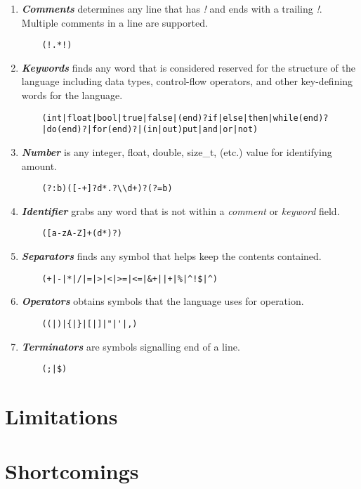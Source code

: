 \documentclass{article}
\begin{document}
    \begin{enumerate}

        \item \emph{\textbf{Comments}} determines any line that has \emph{!} and ends with a trailing \emph{!}. Multiple comments in a line are supported.
        \begin{Verbatim}
    (!.*!)
        \end{Verbatim}
        
        \item \emph{\textbf{Keywords}} finds any word that is considered reserved for the structure of the language including data types, control-flow operators, and other key-defining words for the language.  
        \begin{Verbatim}
    (int|float|bool|true|false|(end)?if|else|then|while(end)?
    |do(end)?|for(end)?|(in|out)put|and|or|not)
        \end{Verbatim}
        
        \item \emph{\textbf{Number}} is any integer, float, double, size\_t, (etc.) value for identifying amount. 
        \begin{Verbatim}
    (?:b)([-+]?d*.?\\d+)?(?=b)
        \end{Verbatim}

        \item \emph{\textbf{Identifier}} grabs any word that is not within a \emph{comment} or \emph{keyword} field.
        \begin{Verbatim}
    ([a-zA-Z]+(d*)?) 
        \end{Verbatim}
        
        \item \emph{\textbf{Separators}} finds any symbol that helps keep the contents contained.
        \begin{Verbatim}
    (+|-|*|/|=|>|<|>=|<=|&+||+|%|^!$|^)
        \end{Verbatim}
        
        \item \emph{\textbf{Operators}} obtains symbols that the language uses for operation.
        \begin{Verbatim}
    ((|)|{|}|[|]|"|'|,)
        \end{Verbatim}
       
        \item \emph{\textbf{Terminators}} are symbols signalling end of a line.
        \begin{Verbatim}
    (;|$) 
        \end{Verbatim}

    \end{enumerate}


\section{Limitations}
\section{Shortcomings}
\end{document}
